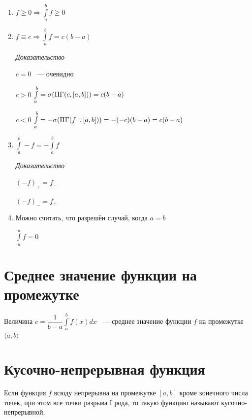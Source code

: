 \documentclass{article}
\begin{document}
		    \begin{enumerate}
		    
		        \item $f \geq 0 \Rightarrow \int\limits^b_a f \geq 0$
		        
		    	\item $f \equiv c \Rightarrow \int\limits^b_a f = c(b - a)$
		        
                    \textit{Доказательство}
                    
		        	$c = 0$ ~--- очевидно
		            
		            $c > 0$ $\int\limits^b_a = \sigma(\Pi\Gamma(c, [a, b])) = c(b - a)$
		            
		            $c < 0$ $\int\limits^b_a = -\sigma(\Pi\Gamma(f_-, [a, b])) = -(-c)(b - a) = c(b - a)$
		            
		       \item $\int\limits^b_a -f = - \int\limits^b_a f$
		       
                    \textit{Доказательство}
                    
		       		$(-f)_+ = f_-$
		       		
		       		$(-f)_- = f_+$
		       		
		       \item Можно считать, что разрешён случай, когда $a = b$
		       
		       		$\int\limits^a_a f = 0$
		       				
		    \end{enumerate}

	\newpage

	\section{Среднее значение функции на промежутке}
	
        Величина $c = \dfrac{1}{b - a} \int\limits^b_a f(x) dx$ ~--- среднее значение функции $f$ на промежутке $\langle a, b \rangle$
        
    \newpage
    
	\section{Кусочно-непрерывная функция}
	
		Если функция $f$ всюду непрерывна на промежутке $[a, b]$ кроме конечного числа точек, при этом все точки разрыва I рода, то такую функцию называют кусочно-непрерывной.
		
\end{document}
